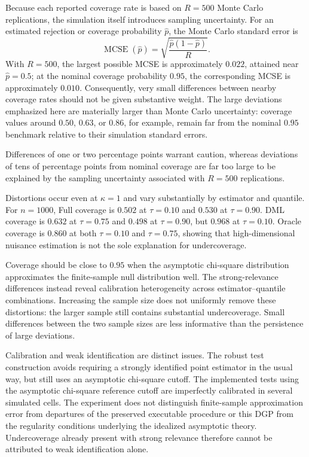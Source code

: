

Because each reported coverage rate is based on $R=500$ Monte Carlo replications, the simulation itself introduces sampling uncertainty. For an estimated rejection or coverage probability $\widehat p$, the Monte Carlo standard error is
\[
\operatorname{MCSE}(\widehat p)
=
\sqrt{\frac{\widehat p(1-\widehat p)}{R}}.
\]
With $R=500$, the largest possible MCSE is approximately $0.022$, attained near $\widehat p=0.5$; at the nominal coverage probability $0.95$, the corresponding MCSE is approximately $0.010$. Consequently, very small differences between nearby coverage rates should not be given substantive weight. The large deviations emphasized here are materially larger than Monte Carlo uncertainty: coverage values around $0.50$, $0.63$, or $0.86$, for example, remain far from the nominal $0.95$ benchmark relative to their simulation standard errors.

Differences of one or two percentage points warrant caution, whereas deviations of tens of percentage points from nominal coverage are far too large to be explained by the sampling uncertainty associated with $R=500$ replications.

Distortions occur even at $\kappa=1$ and vary substantially by estimator and quantile. For $n=1000$, Full coverage is $0.502$ at $\tau=0.10$ and $0.530$ at $\tau=0.90$. DML coverage is $0.632$ at $\tau=0.75$ and $0.498$ at $\tau=0.90$, but $0.968$ at $\tau=0.10$. Oracle coverage is $0.860$ at both $\tau=0.10$ and $\tau=0.75$, showing that high-dimensional nuisance estimation is not the sole explanation for undercoverage.

Coverage should be close to $0.95$ when the asymptotic chi-square distribution approximates the finite-sample null distribution well. The strong-relevance differences instead reveal calibration heterogeneity across estimator--quantile combinations. Increasing the sample size does not uniformly remove these distortions: the larger sample still contains substantial undercoverage. Small differences between the two sample sizes are less informative than the persistence of large deviations.

Calibration and weak identification are distinct issues. The robust test construction avoids requiring a strongly identified point estimator in the usual way, but still uses an asymptotic chi-square cutoff. The implemented tests using the asymptotic chi-square reference cutoff are imperfectly calibrated in several simulated cells. The experiment does not distinguish finite-sample approximation error from departures of the preserved executable procedure or this DGP from the regularity conditions underlying the idealized asymptotic theory. Undercoverage already present with strong relevance therefore cannot be attributed to weak identification alone.

